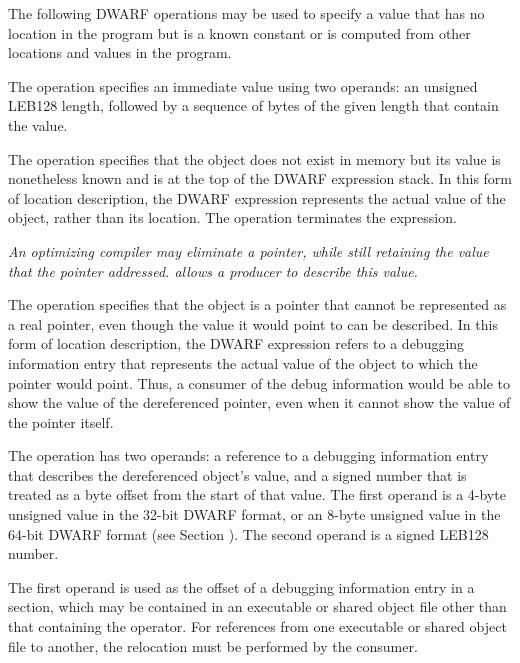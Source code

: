 The following DWARF operations may be used to specify a value
that has no location in the program but is a known constant
or is computed from other locations and values in the program.
\begin{enumerate}[1. ]
\itembfnl{\DWOPimplicitvalueTARG}
The \DWOPimplicitvalueNAME{} operation specifies an immediate value
using two operands: an unsigned LEB128
length, followed by a 
sequence of bytes of the given length that contain the value.

\itembfnl{\DWOPstackvalueTARG}
The \DWOPstackvalueNAME{} 
operation specifies that the object
does not exist in memory but its value is nonetheless known
and is at the top of the DWARF expression stack. In this form
of location description, the DWARF expression represents the
actual value of the object, rather than its location. The
\DWOPstackvalueNAME{} operation terminates the expression.

\itembfnl{\DWOPimplicitpointerTARG}
\textit{An optimizing compiler may eliminate a pointer, while
still retaining the value that the pointer addressed.  
\DWOPimplicitpointerNAME{} allows a producer to describe this value.}

The \DWOPimplicitpointerNAME{} operation specifies that the object
is a pointer that cannot be represented as a real pointer,
even though the value it would point to can be described. In
this form of location description, the DWARF expression refers
to a debugging information entry that represents the actual
value of the object to which the pointer would point. Thus, a
consumer of the debug information would be able to show the
value of the dereferenced pointer, even when it cannot show
the value of the pointer itself.

The \DWOPimplicitpointerNAME{} operation has two operands: a 
reference to a debugging information entry that describes 
the dereferenced object's value, and a signed number that 
is treated as a byte offset from the start of that value. 
The first operand is a 4-byte unsigned value in the 32-bit 
DWARF format, or an 8-byte unsigned value in the 64-bit 
DWARF format (see Section 
).
The second operand is a 
signed LEB128 number.

The first operand is used as the offset of a debugging
information entry in a \dotdebuginfo{} section, which may be
contained in an executable or shared object file other than that
containing the operator. For references from one executable or
shared object file to another, the relocation must be performed 
by the consumer.


\end{enumerate}
